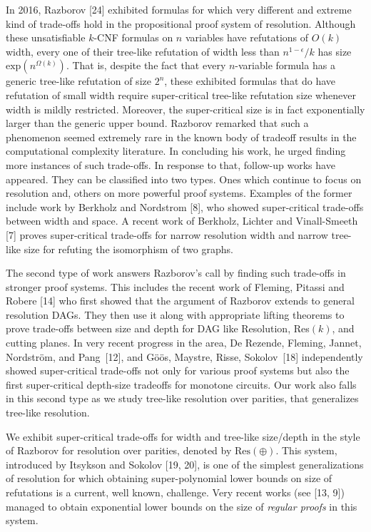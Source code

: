 \documentclass[10pt,a4paper]{article}
\begin{document}
In 2016, Razborov [24] exhibited formulas for which very different and extreme kind of trade-offs hold in the propositional proof system of resolution. Although these unsatisfiable $k$-CNF formulas on $n$ variables have refutations of $O(k)$ width, every one of their tree-like refutation of width less than $n^{1-\epsilon}/k$ has size $\text{exp}(n^{\Omega(k)})$. That is, despite the fact that every $n$-variable formula has a generic tree-like refutation of size $2^{n}$, these exhibited formulas that do have refutation of small width require super-critical tree-like refutation size whenever width is mildly restricted. Moreover, the super-critical size is in fact exponentially larger than the generic upper bound. Razborov remarked that such a phenomenon seemed extremely rare in the known body of tradeoff results in the computational complexity literature. In concluding his work, he urged finding more instances of such trade-offs. In response to that, follow-up works have appeared. They can be classified into two types. Ones which continue to focus on resolution and, others on more powerful proof systems. Examples of the former include work by Berkholz and Nordstrom [8], who showed super-critical trade-offs between width and space. A recent work of Berkholz, Lichter and Vinall-Smeeth [7] proves super-critical trade-offs for narrow resolution width and narrow tree-like size for refuting the isomorphism of two graphs.\par




The second type of work answers Razborov’s call by finding such trade-offs in stronger proof systems. This includes the recent work of Fleming, Pitassi and Robere [14] who first showed that the argument of Razborov extends to general resolution DAGs. They then use it along with appropriate lifting theorems to prove trade-offs between size and depth for DAG like Resolution, Res$(k)$, and cutting planes.
In very recent progress in the area,
De Rezende, Fleming, Jannet, Nordström, and Pang [12], and Göös, Maystre, Risse, Sokolov [18] independently showed super-critical trade-offs not only for various proof systems but also the first super-critical depth-size tradeoffs for monotone circuits.
Our work also falls in this second type as we study tree-like resolution over parities, that generalizes tree-like resolution.\par




We exhibit super-critical trade-offs for width and tree-like size/depth in the style of Razborov for resolution over parities, denoted by $\text{Res}(\oplus)$. This system, introduced by Itsykson and Sokolov [19, 20], is one of the simplest generalizations of resolution for which obtaining super-polynomial lower bounds on size of refutations is a current, well known, challenge. Very recent works (see [13, 9]) managed to obtain exponential lower bounds on the size of \emph{regular proofs} in this system.\par
\end{document}
